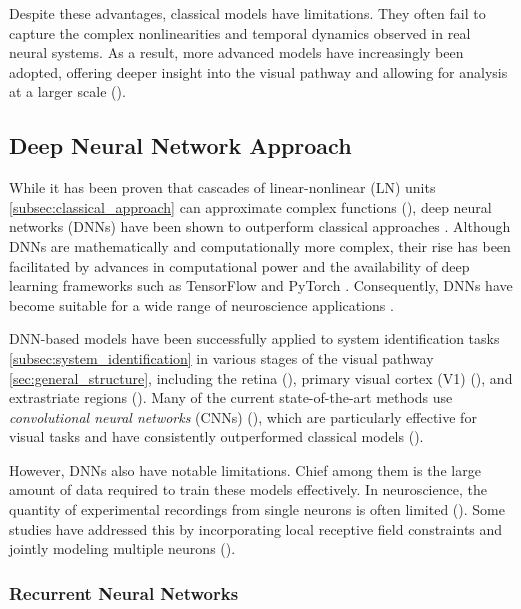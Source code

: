 Despite these advantages, classical models have limitations. They often fail to capture the complex nonlinearities and temporal dynamics observed in real neural systems. As a result, more advanced models have increasingly been adopted, offering deeper insight into the visual pathway and allowing for analysis at a larger scale (\citet{Maheswaranathan340943, Butts11313, keat2001predicting}).

\subsection{Deep Neural Network Approach}
\label{subsec:deep_learning_approach}

While it has been proven that cascades of linear-nonlinear (LN) units \ref{subsec:classical_approach} can approximate complex functions (\citet{cybenko1989approximation, HORNIK1991251}), deep neural networks (DNNs) have been shown to outperform classical approaches \citep{MAL-006, Kriegeskorte2015dnn}. Although DNNs are mathematically and computationally more complex, their rise has been facilitated by advances in computational power and the availability of deep learning frameworks such as TensorFlow \citep{TensorFlow} and PyTorch \citep{paszke2017automatic}. Consequently, DNNs have become suitable for a wide range of neuroscience applications \citep{lecun2015deep}.

DNN-based models have been successfully applied to system identification tasks \ref{subsec:system_identification} in various stages of the visual pathway \ref{sec:general_structure}, including the retina (\cite{Maheswaranathan340943}), primary visual cortex (V1) (\citet{cadena2019conv, kindel2017usingdeeplearningreveal}), and extrastriate regions (\citet{zareh2024deep}). Many of the current state-of-the-art methods use \emph{convolutional neural networks} (CNNs) (\citet{NIPS2012_c399862d}), which are particularly effective for visual tasks and have consistently outperformed classical models (\citet{zhang2019convolutional, cadena2019conv}).

However, DNNs also have notable limitations. Chief among them is the large amount of data required to train these models effectively. In neuroscience, the quantity of experimental recordings from single neurons is often limited (\citet{zhang2019convolutional}). Some studies have addressed this by incorporating local receptive field constraints and jointly modeling multiple neurons (\citet{antolik2016local}).

\subsubsection{Recurrent Neural Networks}
\label{subsubsec:rnns}

